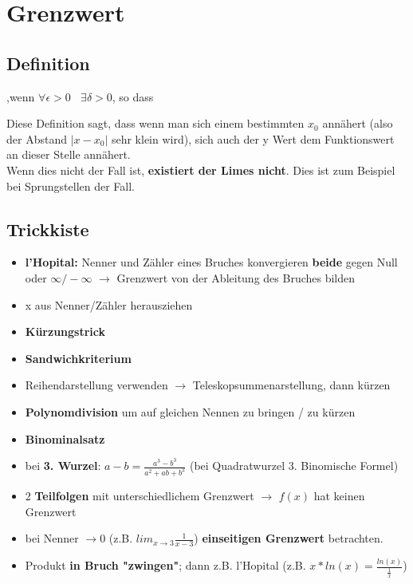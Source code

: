 \documentclass[a4paper,12pt]{article} %
\begin{document}
\section{Grenzwert}
\subsection{Definition}
\begin{center}
\end{center}
,wenn $\forall \epsilon > 0 \ \ \ \ \exists \delta > 0$, so dass
\begin{center}
\end{center}
Diese Definition sagt, dass wenn man sich einem bestimmten $x_0$ annähert (also der Abstand $|x-x_0|$ sehr klein wird), sich auch der y Wert dem Funktionswert an dieser Stelle annähert.\\
Wenn dies nicht der Fall ist, \textbf{existiert der Limes nicht}. Dies ist zum Beispiel bei Sprungstellen der Fall.
\subsection{Trickkiste}
\begin{itemize}
\item \textbf{l'Hopital:} Nenner und Zähler eines Bruches konvergieren \textbf{beide} gegen Null oder $\infty / -\infty$ $\rightarrow$ Grenzwert von der Ableitung des Bruches bilden
\item x aus Nenner/Zähler herausziehen
\item \textbf{Kürzungstrick}
\item \textbf{Sandwichkriterium}
\item Reihendarstellung verwenden $\rightarrow$ Teleskopsummenarstellung, dann kürzen
\item \textbf{Polynomdivision }um auf gleichen Nennen zu bringen / zu kürzen
\item \textbf{Binominalsatz}
\item bei \textbf{3. Wurzel}: $a-b = \frac{a^3-b^3}{a^2+ab+b^2}$ (bei Quadratwurzel 3. Binomische Formel)
\item 2 \textbf{Teilfolgen} mit unterschiedlichem Grenzwert $\rightarrow$ $f(x)$ hat keinen Grenzwert
\item bei Nenner $\rightarrow 0$ (z.B. $lim_{x\rightarrow3} \frac{1}{x-3}$) \textbf{einseitigen Grenzwert} betrachten.
\item Produkt \textbf{in Bruch "zwingen"}; dann z.B. l'Hopital (z.B. $x*ln(x) = \frac{ln(x)}{\frac{1}{x}}$)
\end{itemize}
\end{document}
